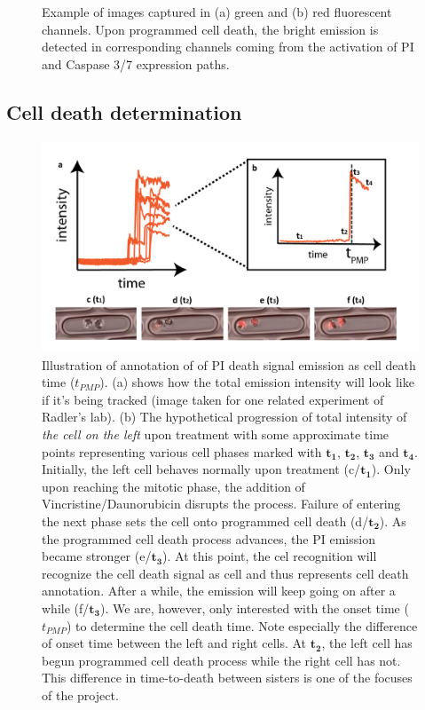 \documentclass[pdftex,12pt,a4paper]{report}
\begin{document}
\begin{figure}[H]
\caption[Example of images from green and red fluorescent channels]{Example of images captured in (a) green and (b) red fluorescent channels. Upon programmed cell death, the bright emission is detected in corresponding channels coming from the activation of PI and Caspase 3/7 expression paths.}

\label{fig:onset_samples}
\end{figure}

\subsection{Cell death determination}




\begin{figure}[H]
\centering
\includegraphics[width=\textwidth]{images/cell_death_detection}
\caption[Illustration of annotation of PI death signal]{Illustration of annotation of of PI death signal emission as cell death time ($t_{PMP}$). (a) shows how the total emission intensity will look like if it's being tracked (image taken for one related experiment of Radler's lab). (b) The hypothetical progression of total intensity of \textit{the cell on the left} upon treatment with some approximate time points representing various cell phases marked with $\mathbf{t_1}$, $\mathbf{t_2}$, $\mathbf{t_3}$ and $\mathbf{t_4}$. Initially, the left cell behaves normally upon treatment (c/$\mathbf{t_1}$). Only upon reaching the mitotic phase, the addition of Vincristine/Daunorubicin disrupts the process. Failure of entering the next phase sets the cell onto programmed cell death (d/$\mathbf{t_2}$). As the programmed cell death process advances, the PI emission became stronger (e/$\mathbf{t_3}$). At this point, the cel recognition will recognize the cell death signal as cell and thus represents cell death annotation. After a while, the emission will keep going on after a while (f/$\mathbf{t_3}$). We are, however, only interested with the onset time ($t_{PMP}$) to determine the cell death time. Note especially the difference of onset time between the left and right cells. At $\mathbf{t_2}$, the left cell has begun programmed cell death process while the right cell has not. This difference in time-to-death between sisters is one of the focuses of the project.
}
\label{fig:cell_death_determination_example}
\end{figure}
\end{document}
